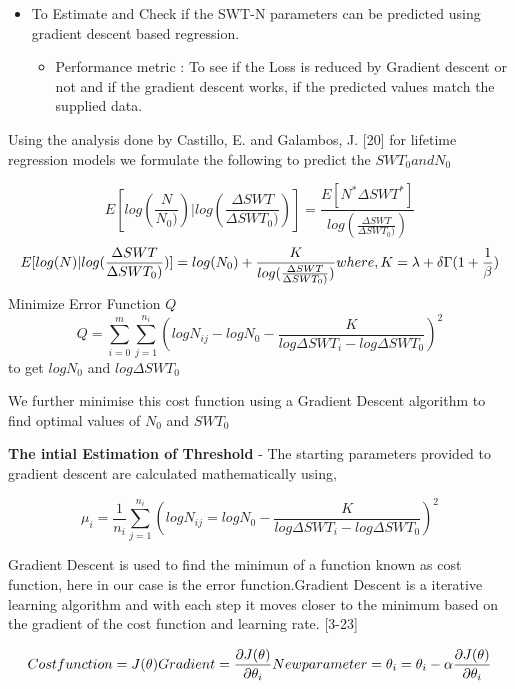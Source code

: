 \documentclass[11pt]{article}
\providecommand{\tightlist}{%
      \setlength{\itemsep}{0pt}\setlength{\parskip}{0pt}}
\begin{document}
\begin{itemize}
\tightlist
\item
  To Estimate and Check if the SWT-N parameters can be predicted using
  gradient descent based regression.

  \begin{itemize}
  \tightlist
  \item
    Performance metric : To see if the Loss is reduced by Gradient
    descent or not and if the gradient descent works, if the predicted
    values match the supplied data.
  \end{itemize}
\end{itemize}

Using the analysis done by Castillo, E. and Galambos, J. {[}20{]} for
lifetime regression models we formulate the following to predict the
\(SWT_0 and N_0\)

\[
E[log(\frac{N}{N_0)}) | log(\frac{\Delta SWT}{\Delta SWT_0)})] = \frac{E[N^*\Delta SWT^*]}{log(\frac{\Delta SWT}{\Delta SWT_0)})}
\] \[
E[log(N) | log(\frac{\Delta SWT}{\Delta SWT_0)})] = log(N_0) + \frac{K}{log(\frac{\Delta SWT}{\Delta SWT_0)})} \\
where, K = \lambda + \delta\Gamma(1+\frac{1}{\beta})
\] Minimize Error Function \(Q\) \[
Q = \sum_{i=0}^m\sum_{j=1}^{n_i}(logN_{ij} - logN_0 - \frac{K}{log\Delta SWT_i - log\Delta SWT_0})^2
\] to get \(logN_0\) and \(log\Delta SWT_0\)

We further minimise this cost function using a Gradient Descent
algorithm to find optimal values of \(N_0\) and \(SWT_0\)

\textbf{The intial Estimation of Threshold} - The starting parameters
provided to gradient descent are calculated mathematically using,

\[
\mu_i = \frac{1}{n_i}\sum_{j=1}^{n_i}(logN_{ij} = logN_0 - \frac{K}{log\Delta SWT_i - log\Delta SWT_0})^2
\]

Gradient Descent is used to find the minimun of a function known as cost
function, here in our case is the error function.Gradient Descent is a
iterative learning algorithm and with each step it moves closer to the
minimum based on the gradient of the cost function and learning rate.
{[}3-23{]}

\[
Cost function = J(\theta) \\
Gradient = \frac{\partial J(\theta)}{\partial \theta_i} \\
New  parameter = \theta_i = \theta_i - \alpha \frac{\partial J(\theta)}{\partial \theta_i} \\
\]
\end{document}
